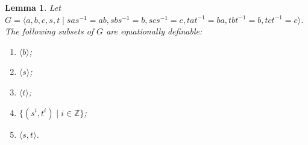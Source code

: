 \documentclass[11pt]{amsart}
\newtheorem{lem}[theorem]{Lemma}
\theoremstyle{definition}
\numberwithin{theorem}{section}
\newcommand{\Z}{\mathbb{Z}}
\begin{document}
	\begin{lem}
		\label{F2byF2-defable}
		Let \(G = \langle a, b, c, s, t \mid sas^{-1} = ab, sbs^{-1} = b,
		scs^{-1} = c, tat^{-1} = ba, tbt^{-1} = b, tct^{-1} = c \rangle\). 
		The following subsets of \(G\) are equationally definable:
		\begin{enumerate}
			\item \(\langle b \rangle\);
					\label{item:F2byF2-b-defable}
			\item \(\langle s \rangle\);
					\label{item:F2byF2-s-defable}
			\item \(\langle t \rangle\);
					\label{item:F2byF2-t-defable}
			\item \(\{(s^i, t^{i}) \mid i \in \Z\}\);
					\label{item:F2byF2-siti-defable}
			\item \(\langle s, t \rangle\).
					\label{item:F2byF2-st-defable}
		\end{enumerate}
	\end{lem}
\end{document}
